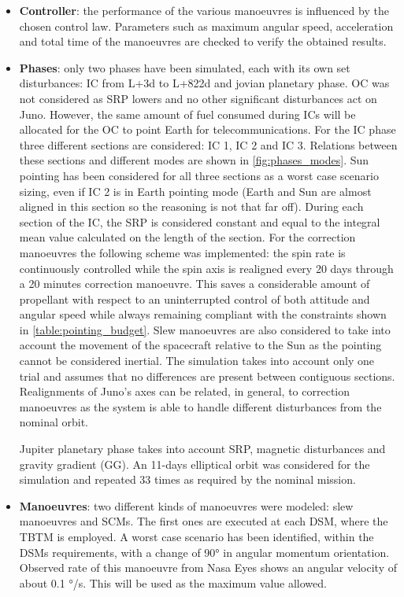 \begin{itemize}
    \item \textbf{Controller}: the performance of the various manoeuvres is influenced by the chosen control law. Parameters such as maximum angular speed, acceleration and total time of the manoeuvres are checked to verify the obtained results. 
    
    \item \textbf{Phases}: only two phases have been simulated, each with its own set disturbances: IC from L+3d to L+822d and jovian planetary phase. 
    OC was not considered as SRP lowers and no other significant disturbances act on Juno. However, the same amount of fuel consumed during ICs will be allocated for the OC to point Earth for telecommunications.
    For the IC phase three different sections are considered: IC 1, IC 2 and IC 3. Relations between these sections and different modes are shown in \autoref{fig:phases_modes}.
    Sun pointing has been considered for all three sections as a worst case scenario sizing, even if IC 2 is in Earth pointing mode (Earth and Sun are almost aligned in this section so the reasoning is not that far off). During each section of the IC, the SRP is considered constant and equal to the integral mean value calculated on the length of the section.
    For the correction manoeuvres the following scheme was implemented: the spin rate is continuously controlled while the spin axis is realigned every 20 days through a 20 minutes correction manoeuvre. This saves a considerable amount of propellant with respect to an uninterrupted control of both attitude and angular speed while always remaining compliant with the constraints shown in \autoref{table:pointing_budget}. 
    Slew manoeuvres are also considered to take into account the movement of the spacecraft relative to the Sun as the pointing cannot be considered inertial. The simulation takes into account only one trial and assumes that no differences are present between contiguous sections. Realignments of Juno's axes can be related, in general, to correction manoeuvres as the system is able to handle different disturbances from the nominal orbit. 
    
    Jupiter planetary phase takes into account SRP, magnetic disturbances and gravity gradient (GG). An 11-days elliptical orbit was considered for the simulation and repeated 33 times as required by the nominal mission. 

    \item \textbf{Manoeuvres}: two different kinds of manoeuvres were modeled: slew manoeuvres and SCMs. The first ones are executed at each DSM, where the TBTM is employed. A worst case scenario has been identified, within the DSMs requirements, with a change of 90° in angular momentum orientation. Observed rate of this manoeuvre from Nasa Eyes\cite{nasa_eyes} shows an angular velocity of about 0.1 °/s. This will be used as the maximum value allowed. 
    

\end{itemize}
